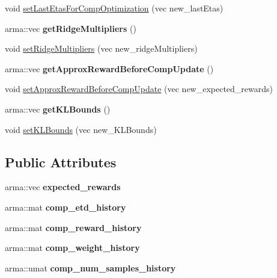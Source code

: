 \begin{DoxyCompactItemize}
\item 
void \hyperlink{classVIPS__Model_ac0f23dd73e953a9da2047075e6e3ff1c}{set\+Last\+Etas\+For\+Comp\+Optimization} (vec new\+\_\+last\+Etas)
\item 
arma\+::vec {\bfseries get\+Ridge\+Multipliers} ()\hypertarget{classVIPS__Model_a4a49a86c96c0f5239ed7b868e0de84b1}{}\label{classVIPS__Model_a4a49a86c96c0f5239ed7b868e0de84b1}

\item 
void \hyperlink{classVIPS__Model_a1d9d04bcc9b0dc392584804ac78f5813}{set\+Ridge\+Multipliers} (vec new\+\_\+ridge\+Multipliers)
\item 
arma\+::vec {\bfseries get\+Approx\+Reward\+Before\+Comp\+Update} ()\hypertarget{classVIPS__Model_a301ce5dc882e0ae70302a4712cc27fc1}{}\label{classVIPS__Model_a301ce5dc882e0ae70302a4712cc27fc1}

\item 
void \hyperlink{classVIPS__Model_a70c45c77ef2f4f7ebd5ddfe34c653da8}{set\+Approx\+Reward\+Before\+Comp\+Update} (vec new\+\_\+expected\+\_\+rewards)
\item 
arma\+::vec {\bfseries get\+K\+L\+Bounds} ()\hypertarget{classVIPS__Model_a24e9a1430fd5dd6d35db69c0490e65d7}{}\label{classVIPS__Model_a24e9a1430fd5dd6d35db69c0490e65d7}

\item 
void \hyperlink{classVIPS__Model_a5351e79e8fc43024659580eceaa89f56}{set\+K\+L\+Bounds} (vec new\+\_\+\+K\+L\+Bounds)
\end{DoxyCompactItemize}
\subsection*{Public Attributes}
\begin{DoxyCompactItemize}
\item 
arma\+::vec {\bfseries expected\+\_\+rewards}\hypertarget{classVIPS__Model_a3ab3746d8dd5832ea0bb0966224a4686}{}\label{classVIPS__Model_a3ab3746d8dd5832ea0bb0966224a4686}

\item 
arma\+::mat {\bfseries comp\+\_\+etd\+\_\+history}\hypertarget{classVIPS__Model_aae18271a9c94997444c4015ce24d666e}{}\label{classVIPS__Model_aae18271a9c94997444c4015ce24d666e}

\item 
arma\+::mat {\bfseries comp\+\_\+reward\+\_\+history}\hypertarget{classVIPS__Model_ad661b9d2f04bdc94a98e773144a8eb5d}{}\label{classVIPS__Model_ad661b9d2f04bdc94a98e773144a8eb5d}

\item 
arma\+::mat {\bfseries comp\+\_\+weight\+\_\+history}\hypertarget{classVIPS__Model_abbb57d44172beac50134b776f5308b0f}{}\label{classVIPS__Model_abbb57d44172beac50134b776f5308b0f}

\item 
arma\+::umat {\bfseries comp\+\_\+num\+\_\+samples\+\_\+history}\hypertarget{classVIPS__Model_a8ab784c4c6c4014a8255cb69813d7608}{}\label{classVIPS__Model_a8ab784c4c6c4014a8255cb69813d7608}

\end{DoxyCompactItemize}
